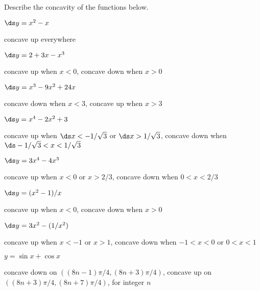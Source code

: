 \begin{enumialphparenastyle}

Describe the concavity of the functions below.

\begin{ex}
 $\ds y=x^2-x$ 
\begin{sol}
 concave up everywhere
\end{sol}
\end{ex}

\begin{ex}
 $\ds y=2+3x-x^3$ 
\begin{sol}
 concave up when $x<0$, concave down when $x>0$
\end{sol}
\end{ex}

\begin{ex}
 $\ds y=x^3-9x^2+24x$
\begin{sol}
 concave down when $x<3$, concave up when $x>3$
\end{sol}
\end{ex}

\begin{ex}
 $\ds y=x^4-2x^2+3$ 
\begin{sol}
 concave up when $\ds x<-1/\sqrt3$ or $\ds x>1/\sqrt3$,
concave down when $\ds -1/\sqrt3<x<1/\sqrt3$
\end{sol}
\end{ex}

\begin{ex}
 $\ds y=3x^4-4x^3$
\begin{sol}
 concave up when $x<0$ or $x>2/3$,
concave down when $0<x<2/3$
\end{sol}
\end{ex}

\begin{ex}
 $\ds y=(x^2-1)/x$
\begin{sol}
 concave up when $x<0$, concave down when $x>0$
\end{sol}
\end{ex}

\begin{ex}
 $\ds y=3x^2-(1/x^2)$ 
\begin{sol}
 concave up when $x<-1$ or $x>1$, concave down when
$-1<x<0$ or $0<x<1$
\end{sol}
\end{ex}

\begin{ex}
 $y=\sin x + \cos x$ 
\begin{sol}
 concave down on $((8n-1)\pi/4,(8n+3)\pi/4)$,
concave up on $((8n+3)\pi/4,(8n+7)\pi/4)$, for integer $n$
\end{sol}
\end{ex}


\end{enumialphparenastyle}
